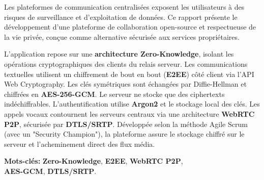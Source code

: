 Les plateformes de communication centralisées exposent les utilisateurs à des risques de surveillance et d'exploitation de données. Ce rapport présente le développement d'une plateforme de collaboration open-source et respectueuse de la vie privée, conçue comme alternative sécurisée aux services propriétaires.

L'application repose sur une \textbf{architecture Zero-Knowledge}, isolant les opérations cryptographiques des clients du relais serveur. Les communications textuelles utilisent un chiffrement de bout en bout (\textbf{E2EE}) côté client via l'API Web Cryptography. Les clés symétriques sont échangées par Diffie-Hellman et chiffrées en \textbf{AES-256-GCM}. Le serveur ne stocke que des ciphertexts indéchiffrables. L'authentification utilise \textbf{Argon2} et le stockage local des clés. Les appels vocaux contournent les serveurs centraux via une architecture \textbf{WebRTC P2P}, sécurisée par \textbf{DTLS/SRTP}. Développée selon la méthode Agile Scrum (avec un "Security Champion"), la plateforme assure le stockage chiffré sur le serveur et l'acheminement direct des flux média.

\vspace{1em}

\noindent \textbf{\Large Mots-clés:}
\textbf{Zero-Knowledge}, \textbf{E2EE}, \textbf{WebRTC P2P}, \\
\textbf{AES-GCM}, \textbf{DTLS/SRTP}.